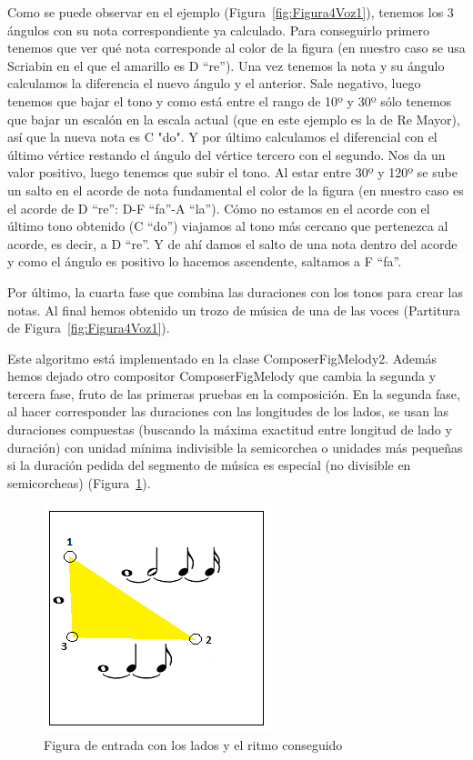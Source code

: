 Como se puede observar en el ejemplo (Figura~\ref{fig:Figura4Voz1}), tenemos los 3 ángulos con su nota correspondiente ya calculado. Para conseguirlo primero tenemos que ver qué nota corresponde al color de la figura (en nuestro caso se usa Scriabin en el que el amarillo es D ``re''). Una vez tenemos la nota y su ángulo calculamos la diferencia el nuevo ángulo y el anterior. Sale negativo, luego tenemos que bajar el tono y como está entre el rango de 10º y 30º sólo tenemos que bajar un escalón en la escala actual (que en este ejemplo es la de Re Mayor), así que la nueva nota es C "do". Y por último calculamos el diferencial con el último vértice restando el ángulo del vértice tercero con el segundo. Nos da un valor positivo, luego tenemos que subir el tono. Al estar entre 30º y 120º se sube un salto en el acorde de nota fundamental el color de la figura (en nuestro caso es el acorde de D ``re'': D-F ``fa''-A ``la''). Cómo no estamos en el acorde con el último tono obtenido (C ``do'') viajamos al tono más cercano que pertenezca al acorde, es decir, a D ``re''. Y de ahí damos el salto de una nota dentro del acorde y como el ángulo es positivo lo hacemos ascendente, saltamos a F ``fa''.

Por último, la cuarta fase que combina las duraciones con los tonos para crear las notas. Al final hemos obtenido un trozo de música de una de las voces (Partitura de Figura~\ref{fig:Figura4Voz1}).

Este algoritmo está implementado en la clase ComposerFigMelody2. Además hemos dejado otro compositor ComposerFigMelody que cambia la segunda y tercera fase, fruto de las primeras pruebas en la composición. En la segunda fase, al hacer corresponder las duraciones con las longitudes de los lados, se usan las duraciones compuestas (buscando la máxima exactitud entre longitud de lado y duración) con unidad mínima indivisible la semicorchea o unidades más pequeñas si la duración pedida del segmento de música es especial (no divisible en semicorcheas) (Figura~\ref{fig:Figura5Voz1}).

		\begin{figure}[htbp]
		\centering
		\hspace*{0.0in}
		\includegraphics[scale=1]{graphics/simpletest1-F2_2.png}
		\caption{Figura de entrada con los lados y el ritmo conseguido}
		\label{fig:Figura5Voz1}
		\end{figure}

